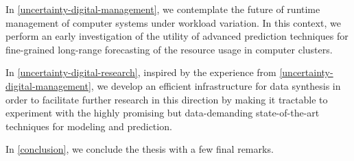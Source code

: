 In \cref{uncertainty-digital-management}, we contemplate the future of runtime
management of computer systems under workload variation. In this context, we
perform an early investigation of the utility of advanced prediction techniques
for fine-grained long-range forecasting of the resource usage in computer
clusters.

In \cref{uncertainty-digital-research}, inspired by the experience from
\cref{uncertainty-digital-management}, we develop an efficient infrastructure
for data synthesis in order to facilitate further research in this direction by
making it tractable to experiment with the highly promising but data-demanding
state-of-the-art techniques for modeling and prediction.

In \cref{conclusion}, we conclude the thesis with a few final remarks.
